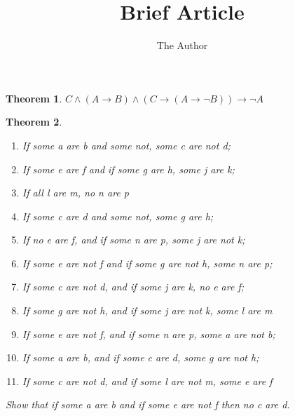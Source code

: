 \documentclass[11pt, oneside]{article}   	%
\title{Brief Article}
\author{The Author}
\newtheorem{theorem}{Theorem}							%
\begin{document}
\maketitle
\begin{theorem}
$ C \land (A \rightarrow B) \land (C \rightarrow ( A \rightarrow \neg B)) \rightarrow \neg A$
\end{theorem}


\begin{theorem}
 \begin{enumerate}
 \item If some a are b and some not, some c are not d;
 
 \item If some e are f and if some g are h, some j are k;
 \item  If all l are m, no n are p
\item If some c are d and some not, some g are h;
\item If no e are f, and if some n are p, some j are not k; 
\item If some e are not f and if some g are not h, some n are p; 
\item If some c are not d, and if some j are k, no e are f;
\item If some g are not h, and if some j are not k, some l are m
\item  If some e are not f, and if some n are p, some a are not b; 
\item  If some a are b, and if some c are d, some g are not h;
\item  If some c are not d, and if some l are not m, some e are f
 \end{enumerate}
 Show that if some a are b and if some e are not f then no c are d.
 \end{theorem}
\end{document}
